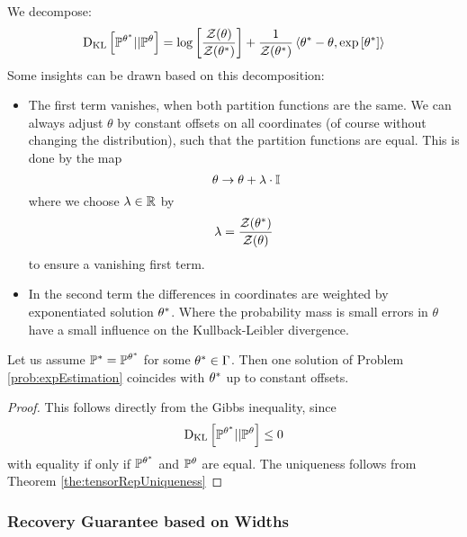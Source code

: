 We decompose:
\begin{align}
	\mathrm{D}_{\mathrm{KL}}\left[ \mathbb{P}^{\theta^*} || \mathbb{P}^{\theta} \right] 
	= \log\left[\frac{\mathcal{Z}{\left(\theta\right)}}{\mathcal{Z}{\left(\theta^*\right)}}\right] 
	+ \frac{1}{\mathcal{Z}{\left(\theta^*\right)}} \braket{\theta^*-\theta,\mathrm{exp}\left[\theta^*\right]}
\end{align}
Some insights can be drawn based on this decomposition:
\begin{itemize}
	\item The first term vanishes, when both partition functions are the same.
		We can always adjust $\theta$ by constant offsets on all coordinates (of course without changing the distribution), such that the partition functions are equal.
		This is done by the map
			\[ \theta \rightarrow \theta + \lambda \cdot \ones \]
		where we choose $\lambda\in\mathbb{R}$ by
			\[ \lambda = \frac{\mathcal{Z}{\left(\theta^*\right)}}{\mathcal{Z}{\left(\theta\right)}} \]
		to ensure a vanishing first term.		
	\item In the second term the differences in coordinates are weighted by exponentiated solution $\theta^*$.
		Where the probability mass is small errors in $\theta$ have a small influence on the Kullback-Leibler divergence.
\end{itemize}


\begin{theorem}
	Let us assume $\mathbb{P}^* = \mathbb{P}^{\theta^*}$ for some $\theta^*\in\Gamma$. 
	Then one solution of Problem \ref{prob:expEstimation} coincides with $\theta^*$ up to constant offsets.
\end{theorem}
\begin{proof}
	This follows directly from the Gibbs inequality, since 
	\begin{align}
		\mathrm{D}_{\mathrm{KL}}\left[ \mathbb{P}^{\theta^*} || \mathbb{P}^{\theta} \right] \leq 0
	\end{align}
	with equality if only if $\mathbb{P}^{\theta^*}$ and $\mathbb{P}^{\theta}$ are equal.
	The uniqueness follows from Theorem \ref{the:tensorRepUniqueness}
\end{proof}









\subsubsection{Recovery Guarantee based on Widths}

